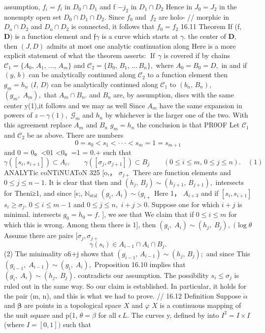 assumption, $\scriptstyle f_{i}=f_{i}$ in $D_{0}\cap D_{1}$ and f $\scriptstyle-j_{2}$ in $D_{1}\cap D_{2}$ Hence in $\scriptstyle J_{0}=J_{2}$ in the nonempty open set $D_{0}\cap D_{1}\cap D_{2}.$ Since $f_{0}$ and $\ f_{2}$ are holo- // morphic in $D_{\mathrm{o}}\cap D_{2}$ and $D_{\mathrm{o}}\cap D_{2}$ is connected, it follows that $f_{0}=f_{2}$ 16.11 Theorem If (f, ${\boldsymbol{D}})$ is a function element and ${\mathfrak{f}}\gamma$ is a curve which starts at $\scriptstyle{\gamma}.$ the center of ${\boldsymbol{D}},$ then $\scriptstyle(J,D)$ admits at most one analytic continuation along Here is a more explicit statement of what the theorem asserts: $\operatorname{If}\,\gamma$ is covered if by chains ${\mathcal{C}}_{1}=\{A_{0},\,A_{1},\,...,\,A_{m}\}$ and ${\mathcal{C}}_{2}=\{B_{0},\,B_{1},\,\dots\,B_{n}\},$ where $A_{0}=B_{0}=D,$ in and if $\scriptstyle(y,\,b)$ can be analytically continued along ${\mathcal{C}}_{2}$ to a function element then $g_{m}=h_{n}$ $\scriptstyle(\scriptstyle I,\,D\rangle$ can be analytically continued along ${\mathcal{C}}_{1}$ to $(b_{n},\,B_{n}),$ $(g_{m},\;A_{m}),$ that $A_{m}\cap B_{n}.$ and $B_{n}$ are, by assumption, discs with the same center y(1),it follows and we may as well Since $A_{m}$ have the same expansion in powers of $z-\gamma(1),$ ${\mathcal{G}}_{m}$ and $h_{n}$ by whichever is the larger one of the two. With this agreement replace $A_{m}$ and $B_{n}$ $g_{m}=h_{n}$ the conclusion is that PR0OF Let ${\mathcal{C}}_{1}$ and ${\mathcal{C}}_{2}$ be as above. There are numbers $$ 0=s_{0}<s_{1}<\cdot\cdot\cdot<s_{m}=1=s_{m+1} $$ and 0 = 0。<01 <0。=1 = 0.+ such that $$ \gamma([s_{i},s_{i+1}])\subset A_{i},\qquad\gamma([\sigma_{j},\sigma_{j+1}])\subset B_{j}\qquad(0\leq i\leq m,\,0\leq j\leq n).\quad(1) $$ANALYTic coNTiNUAToN 325 [o,， $\sigma_{j+}$ There are function elements and $0\leq j\leq n-1.$ ${\mathrm{It}}$ is clear that then and $(h_{j},\,B_{j})\sim(h_{j+1},\,B_{j+1}),$ intersects for Theni≥1, and since [s;, $\scriptstyle\mathbb{N}_{\mathrm{stal}}$ $(g_{i},\,A_{i})\sim(g_{i+}$ Here 1， $\scriptstyle A_{i+3}$ and if $[s_{i},s_{i+1}]$ $s_{i}\geq\sigma_{j}.$ $0\leq i\leq m-1$ and $0\leq j\leq n,$ $i+j>0.$ Suppose one for which $\scriptstyle{i+j}$ is minimal. intersects $g_{0}=h_{0}=f.$ ], we see that We claim that if $0\leq i\leq m$ for which this is wrong. Among them there is 1], then $(g_{i},\;A_{i})\sim(h_{j},\;B_{j}),$ $\scriptstyle(\log\theta$ Assume there are pairs $[\sigma_{j},\sigma_{j+}$ $$ \gamma(s_{i})\in A_{i-1}\cap A_{i}\cap B_{j}. $$ (2) The minimality ofi+j shows that $(g_{i-1},\,A_{i-1})\sim(h_{j},\,B_{j});$ and since This $(g_{i-1},\;A_{i-1})\sim(g_{i},\;A_{i}),$ Proposition 16.10 implies that $(g_{i},\;A_{i})\sim(h_{j},\;B_{j}).$ contradicts our assumption. The possibility $s_{i}\leq\sigma_{j}$ is ruled out in the same way. So our claim is established. In particular, it holds for the pair (m, n), and this is what we had to prove. // 16.12 Definition Suppose $\scriptstyle{\dot{\alpha}}$ and $\boldsymbol{\beta}$ are points in a topological space $X$ and $\varphi$ $X$ is a continuous mapping of the unit square and p(1, $\scriptstyle{\theta=\beta}$ for all $\textstyle{\epsilon\,L.}$ The curves y, defined by into $I^{2}=I\times I$ (where $I=[0,1])$ such that 